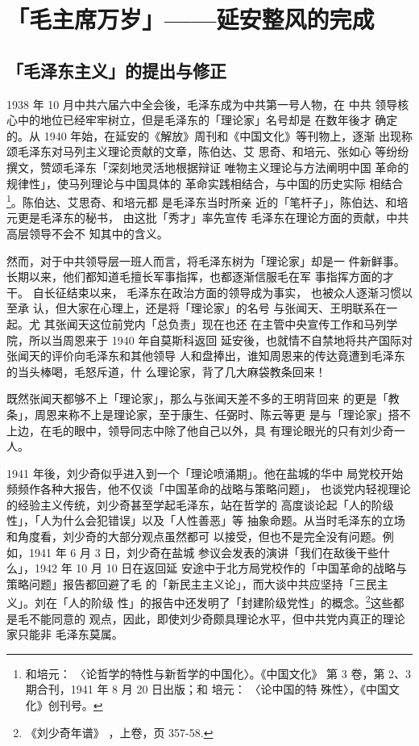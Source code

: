 \chapter{「毛主席万岁」——延安整风的完成}
\section{「毛泽东主义」的提出与修正}
1938 年 10 月中共六届六中全会後，毛泽东成为中共第一号人物，在 中共
领导核心中的地位已经牢牢树立，但是毛泽东的「理论家」名号却是 在数年後才
确定的。从 1940 年始，在延安的《解放》周刊和《中国文化》等刊物上，逐渐
出现称颂毛泽东对马列主义理论贡献的文章，陈伯达、艾 思奇、和培元、张如心
等纷纷撰文，赞颂毛泽东「深刻地灵活地根据辩证 唯物主义理论与方法阐明中国
革命的规律性」，使马列理论与中国具体的 革命实践相结合，与中国的历史实际
相结合\footnote{和培元： 〈论哲学的特性与新哲学的中国化〉。《中国文化》
第 3 卷，第 2、3 期合刊，1941 年 8 月 20 日出版；和 培元： 〈论中国的特
殊性〉，《中国文化》创刊号。}。陈伯达、艾思奇、和培元都 是毛泽东当时所亲
近的「笔杆子」，陈伯达、和培元更是毛泽东的秘书， 由这批「秀才」率先宣传
毛泽东在理论方面的贡献，中共高层领导不会不 知其中的含义。

然而，对于中共领导层一班人而言，将毛泽东树为「理论家」却是一 件新鲜事。
长期以来，他们都知道毛擅长军事指挥，也都逐渐信服毛在军 事指挥方面的才干。
自长征结束以来， 毛泽东在政治方面的领导成为事实， 也被众人逐渐习惯以至承
认，但大家在心理上，还是将「理论家」的名号 与张闻天、王明联系在一起。尤
其张闻天这位前党内「总负责」现在也还
在主管中央宣传工作和马列学院，所以当周恩来于 1940 年自莫斯科返回
延安後，也就情不自禁地将共产国际对张闻天的评价向毛泽东和其他领导
人和盘捧出，谁知周恩来的传达竟遭到毛泽东的当头棒喝，毛怒斥道，什
么理论家，背了几大麻袋教条回来！

既然张闻天都够不上「理论家」，那么与张闻天差不多的王明背回来
的更是「教条」，周恩来称不上是理论家，至于康生、任弼时、陈云等更
是与「理论家」搭不上边，在毛的眼中，领导同志中除了他自己以外，具
有理论眼光的只有刘少奇一人。

1941 年後，刘少奇似乎进入到一个「理论喷涌期」。他在盐城的华中
局党校开始频频作各种大报告，他不仅谈「中国革命的战略与策略问题」，
也谈党内轻视理论的经验主义传统，刘少奇甚至学起毛泽东，站在哲学的
高度谈论起「人的阶级性」，「人为什么会犯错误」以及「人性善恶」等
抽象命题。从当时毛泽东的立场和角度看，刘少奇的大部分观点虽然都可
以接受，但也不是完全没有问题。例如，1941 年 6 月 3 日，刘少奇在盐城
参议会发表的演讲「我们在敌後干些什么」，1942 年 10 月 10 日在返回延
安途中于北方局党校作的「中国革命的战略与策略问题」报告都回避了毛
的「新民主主义论」，而大谈中共应坚持「三民主义」。刘在「人的阶级
性」的报告中还发明了「封建阶级党性」的概念。\footnote{《刘少奇年谱》
，上卷，页 357-58.}这些都是毛不能同意的
观点，因此，即使刘少奇颇具理论水平，但中共党内真正的理论家只能非
毛泽东莫属。

